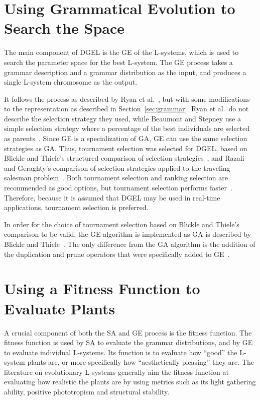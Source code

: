 \section{Using Grammatical Evolution to Search the Space}
The main component of \gls{DGEL} is the \gls{GE} of the \glspl{L-system}, which is used to search the parameter space for the best \gls{L-system}.
The \gls{GE} process takes a grammar description and a grammar distribution as the input, and produces a single \gls{L-system} chromosome as the output.

It follows the process as described by Ryan et al.~\cite{1998Ryan}, but with some modifications to the representation as described in Section~\ref{sec:grammar}.
Ryan et al.\ do not describe the selection strategy they used, while Beaumont and Stepney use a simple selection strategy where a percentage of the best individuals are selected as parents~\cite{2009Beaumont}.
Since \gls{GE} is a specialization of \gls{GA}, \gls{GE} can use the same selection strategies as \gls{GA}.
Thus, tournament selection was selected for \gls{DGEL}, based on Blickle and Thiele's structured comparison of selection strategies~\cite{1995Blickle}, and Razali and Geraghty's comparison of selection strategies applied to the traveling salesman problem~\cite{2011Razali}.
Both tournament selection and ranking selection are recommended as good options, but tournament selection performs faster~\cite{1995Blickle}.
Therefore, because it is assumed that \gls{DGEL} may be used in real-time applications, tournament selection is preferred.

In order for the choice of tournament selection based on Blickle and Thiele's comparison to be valid, the \gls{GE} algorithm is implemented as \gls{GA} is described by Blickle and Thiele~\cite{1995Blickle}.
The only difference from the \gls{GA} algorithm is the addition of the duplication and prune operators that were specifically added to \gls{GE}~\cite{1998Ryan}.

\section{Using a Fitness Function to Evaluate Plants}
A crucial component of both the \gls{SA} and \gls{GE} process is the fitness function.
The fitness function is used by \gls{SA} to evaluate the grammar distributions, and by \gls{GE} to evaluate individual \glspl{L-system}.
Its function is to evaluate how ``good'' the \gls{L-system} plants are, or more specifically how ``aesthetically pleasing'' they are.
The literature on evolutionary \glspl{L-system} generally aim the fitness function at evaluating how realistic the plants are by using metrics such as its light gathering ability, positive phototropism and structural stability.

